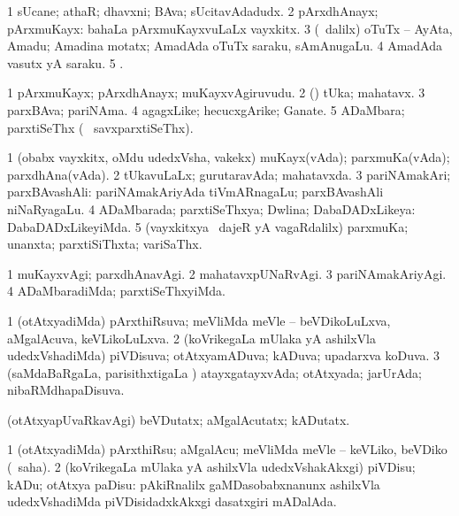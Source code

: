\bentry
{}
\gl{\nA}
\bmng
\bnum
\num{1} sUcane; athaR; dhavxni; BAva; sUcitavAdadudx. 
\num{2} pArxdhAnayx; pArxmuKayx:  bahaLa pArxmuKayxvuLaLx vayxkitx. 
\num{3} (\sA\ \bava dalilx) oTuTx -- AyAta, Amadu; Amadina motatx; AmadAda oTuTx saraku, sAmAnugaLu. 
\num{4} AmadAda vasutx yA saraku. 
\num{5} . 
\enum
\emng
\eentry

\bentry
{}
\gl{\nA}
\bmng
\bnum
\num{1} pArxmuKayx; pArxdhAnayx; muKayxvAgiruvudu. 
\num{2} (\rUpa) tUka; mahatavx. 
\num{3} parxBAva; pariNAma. 
\num{4} agagxLike; hecucxgArike; Ganate. 
\num{5} ADaMbara; parxtiSeThx (\sA\  savxparxtiSeThx). 
\enum
\emng
\eentry

\bentry
{}
\gl{\gu}
\bmng
\bnum
\num{1} (obabx vayxkitx, oMdu udedxVsha, \mo vakekx) muKayx(vAda); parxmuKa(vAda); parxdhAna(vAda). 
\num{2} tUkavuLaLx; gurutaravAda; mahatavxda. 
\num{3} pariNAmakAri; parxBAvashAli:  pariNAmakAriyAda tiVmARnagaLu; parxBAvashAli niNaRyagaLu. 
\num{4} ADaMbarada; parxtiSeThxya; Dwlina; DabaDADxLikeya:  DabaDADxLikeyiMda. 
\num{5} (vayxkitxya \vi\ dajeR yA vagaRdalilx) parxmuKa; unanxta; parxtiSiThxta; variSaThx. 
\enum
\emng
\eentry

\bentry
{}
\gl{\kirxvi}
\bmng
\bnum
\num{1} muKayxvAgi; parxdhAnavAgi. 
\num{2} mahatavxpUNaRvAgi. 
\num{3} pariNAmakAriyAgi. 
\num{4} ADaMbaradiMda; parxtiSeThxyiMda. 
\enum
\emng
\eentry

\bentry
{}
\gl{\gu}
\bmng
\bnum
\num{1} (otAtxyadiMda) pArxthiRsuva; meVliMda meVle -- beVDikoLuLxva, aMgalAcuva, keVLikoLuLxva. 
\num{2} (koVrikegaLa mUlaka yA ashilxVla udedxVshadiMda) piVDisuva; otAtxyamADuva; kADuva; upadarxva koDuva. 
\num{3} (saMdaBaRgaLa, parisithxtigaLa \vi) atayxgatayxvAda; otAtxyada; jarUrAda; nibaRMdhapaDisuva. 
\enum
\emng
\eentry

\bentry
{}
\gl{\kirxvi}
\bmng
(otAtxyapUvaRkavAgi) beVDutatx; aMgalAcutatx; kADutatx. 
\emng
\eentry

\bentry
{}
\gl{\sakirx}
\bmng
\bnum
\num{1} (otAtxyadiMda) pArxthiRsu; aMgalAcu; meVliMda meVle -- keVLiko, beVDiko (\akirx\ saha). 
\num{2} (koVrikegaLa mUlaka yA ashilxVla udedxVshakAkxgi) piVDisu; kADu; otAtxya paDisu:  pAkiRnalilx gaMDasobabxnanunx ashilxVla udedxVshadiMda piVDisidadxkAkxgi dasatxgiri mADalAda. 
\enum
\emng
\eentry

